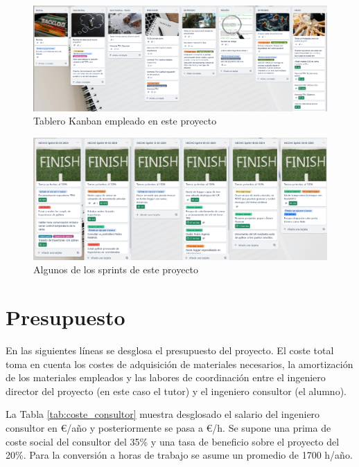 \begin{figure}[h!]
    \centering
    \includegraphics[width=\linewidth]{figuras/tablero_kanban_trello_tfm.png}
    \caption{Tablero Kanban empleado en este proyecto}
    \label{fig:kanban_TFM}
\end{figure}

\begin{figure}[h!]
    \centering
    \includegraphics[width=\linewidth]{figuras/tablero_kanban_algunos_sprints.png}
    \caption{Algunos de los sprints de este proyecto}
    \label{fig:sprints_kanban_TFM}
\end{figure}


\section{Presupuesto}

En las siguientes líneas se desglosa el presupuesto del proyecto. El coste total toma en cuenta los costes de adquisición de materiales necesarios, la amortización de los materiales empleados y las labores de coordinación entre el ingeniero director del proyecto (en este caso el tutor) y el ingeniero consultor (el alumno). 

La Tabla \ref{tab:coste_consultor} muestra desglosado el salario del ingeniero consultor en \euro/año y posteriormente se pasa a \euro/h. Se supone una prima de coste social del consultor del 35\% y una tasa de beneficio sobre el proyecto del 20\%. Para la conversión a horas de trabajo se asume un promedio de 1700 h/año.



